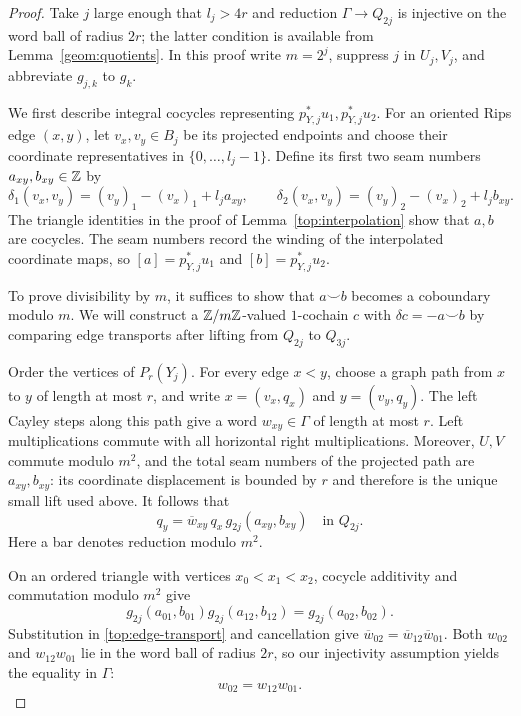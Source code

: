 \begin{proof}
Take $j$ large enough that $l_j>4r$ and reduction
$\Gamma\to Q_{2j}$ is injective on the word ball of radius $2r$;
the latter condition is available from Lemma~\ref{geom:quotients}.
In this proof write $m=2^j$, suppress $j$ in $U_j,V_j$, and abbreviate
$g_{j,k}$ to $g_k$.

We first describe integral cocycles representing
$p_{Y,j}^*u_1,p_{Y,j}^*u_2$. For an oriented Rips edge $(x,y)$, let
$v_x,v_y\in B_j$ be its projected endpoints and choose their coordinate
representatives in $\{0,\ldots,l_j-1\}$. Define its first two seam
numbers $a_{xy},b_{xy}\in\mathbb Z$ by
\[
 \delta_1(v_x,v_y)=(v_y)_1-(v_x)_1+l_j a_{xy},
 \qquad
 \delta_2(v_x,v_y)=(v_y)_2-(v_x)_2+l_j b_{xy}.
\]
The triangle identities in the proof of Lemma~\ref{top:interpolation}
show that $a,b$ are cocycles. The seam numbers record the winding of
the interpolated coordinate maps, so
$[a]=p_{Y,j}^*u_1$ and $[b]=p_{Y,j}^*u_2$.

To prove divisibility by $m$, it suffices to show that $a\smile b$
becomes a coboundary modulo $m$. We will construct a
$\mathbb Z/m\mathbb Z$-valued $1$-cochain $c$ with $\delta c=-a\smile b$ by
comparing edge transports after lifting from $Q_{2j}$ to $Q_{3j}$.

Order the vertices of $P_r(Y_j)$. For every edge $x<y$, choose a graph
path from $x$ to $y$ of length at most $r$, and write
$x=(v_x,q_x)$ and $y=(v_y,q_y)$. The left Cayley steps along this path
give a word $w_{xy}\in\Gamma$ of length at most $r$. Left
multiplications commute with all horizontal right multiplications.
Moreover, $U,V$ commute modulo $m^2$, and the total seam numbers of the
projected path are $a_{xy},b_{xy}$: its coordinate displacement is
bounded by $r$ and therefore is the unique small lift used above.
It follows that
\begin{equation}
 q_y=\overline w_{xy}\,q_x\,g_{2j}(a_{xy},b_{xy})
 \quad\text{in }Q_{2j}.
 \label{top:edge-transport}
\end{equation}
Here a bar denotes reduction modulo $m^2$.

On an ordered triangle with vertices $x_0<x_1<x_2$, cocycle additivity
and commutation modulo $m^2$ give
\[
 g_{2j}(a_{01},b_{01})g_{2j}(a_{12},b_{12})
 =g_{2j}(a_{02},b_{02}).
\]
Substitution in \eqref{top:edge-transport} and cancellation give
$\overline w_{02}=\overline w_{12}\overline w_{01}$. Both
$w_{02}$ and $w_{12}w_{01}$ lie in the word ball of radius $2r$, so
our injectivity assumption yields the equality in $\Gamma$:
\begin{equation}
 w_{02}=w_{12}w_{01}.
 \label{top:word-triangle}
\end{equation}


\end{proof}

